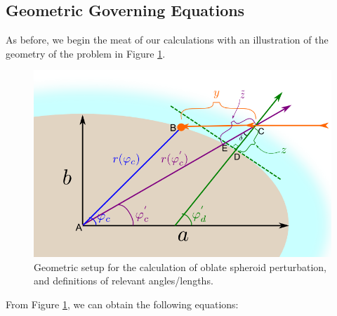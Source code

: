 \documentclass[10pt]{article}
\begin{document}
\subsection{Geometric Governing Equations}

As before, we begin the meat of our calculations with an illustration of the geometry of the problem in Figure \ref{fig:spheroid_geom}.

\begin{figure}[!h]
	\centering
		\includegraphics[width=130mm]{spheroid_2.png}
	\caption{Geometric setup for the calculation of oblate spheroid perturbation, and definitions of relevant angles/lengths.}
	\label{fig:spheroid_geom}
\end{figure}
\vspace{10pt}
From Figure \ref{fig:spheroid_geom}, we can obtain the following equations:
\end{document}
